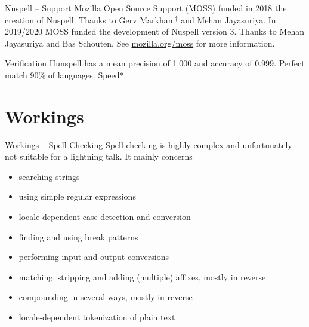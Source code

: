 \documentclass{beamer}
\begin{document}
\begin{frame}{Nuspell – Support}
Mozilla Open Source Support (MOSS) funded in 2018 the creation of Nuspell. Thanks to Gerv Markham$^†$ and Mehan Jayasuriya. In 2019/2020 MOSS funded the development of Nuspell version 3. Thanks to Mehan Jayasuriya and Bas Schouten. See \href{https://mozilla.org/moss}{mozilla.org/moss} for more information.

\begin{figure}
\centering
\def\svgwidth{.75\columnwidth}

\end{figure}
Verification Hunspell has a mean precision of 1.000 and accuracy of 0.999. Perfect match 90\% of languages. \alert{Speed*.}
\end{frame}



\section{Workings}

\begin{frame}{Workings – Spell Checking}
Spell checking is \alert{highly complex} and unfortunately not suitable for a lightning talk. It mainly concerns
\begin{itemize}
\item searching strings
\item using simple regular expressions
\item locale-dependent case detection and conversion
\item finding and using break patterns
\item performing input and output conversions
\item matching, stripping and adding (multiple) affixes, mostly in reverse
\item compounding in several ways, mostly in reverse
\item locale-dependent tokenization of plain text
\end{itemize}
\end{frame}
\end{document}
